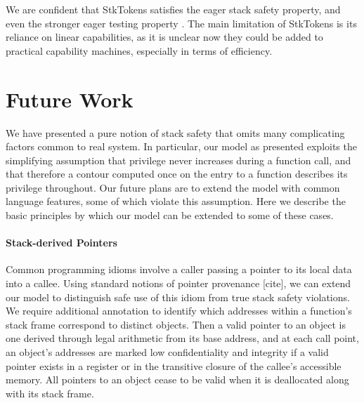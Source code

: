 \documentclass[acmsmall,review,anonymous]{acmart}\settopmatter{printfolios=true,printccs=false,printacmref=false}
\begin{document}
{We are confident  that
StkTokens satisfies the eager stack safety property, and even the stronger eager
testing property . The main limitation of StkTokens is its reliance on
linear capabilities, as it is unclear now they could be added to practical
capability machines, especially in terms of efficiency.
%


\section{Future Work}
  \label{sec:future}

  We have presented a pure notion of stack safety that omits many complicating
  factors common to real system. In particular, our model as presented exploits
  the simplifying assumption that privilege never increases during a function
  call, and that therefore a contour computed once on the entry to a function
  describes its privilege throughout. Our future plans are to extend the model
  with common language features, some of which violate this assumption. Here we
  describe the basic principles by which our model can be extended to some of
  these cases.

  \paragraph{Stack-derived Pointers}

    Common programming idioms involve a caller passing a pointer to its local
    data into a callee. Using standard notions of pointer provenance [cite],
    we can extend our model to distinguish safe use of this idiom from true
    stack safety violations. We require additional annotation to identify
    which addresses within a function's stack frame correspond to distinct
    objects. Then a valid pointer to an object is one derived through legal
    arithmetic from its base address, and at each call point, an object's
    addresses are marked low confidentiality and integrity if a valid pointer
    exists in a register or in the transitive closure of the callee's
    accessible memory. All pointers to an object cease to be valid when it is
    deallocated along with its stack frame.

}
\end{document}
